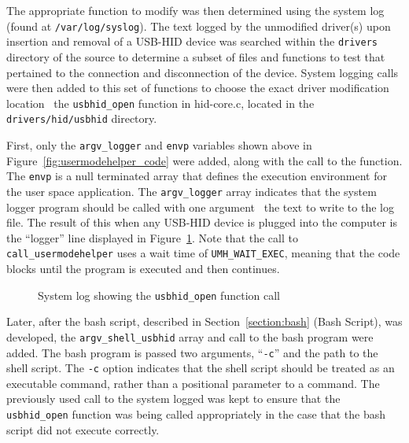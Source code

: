 \documentclass[pagenumbers]{ieee}
\begin{document}
The appropriate function to modify was then determined using the system log (found at \texttt{/var/log/syslog}). The text logged by the unmodified driver(s) upon insertion and removal of a USB-HID device was searched within the \texttt{drivers} directory of the source to determine a subset of files and functions to test that pertained to the connection and disconnection of the device. System logging calls were then added to this set of functions to choose the exact driver modification location \textemdash \ the \texttt{usbhid\_open} function in hid-core.c, located in the \texttt{drivers/hid/usbhid} directory.

First, only the \texttt{argv\_logger} and \texttt{envp} variables shown above in Figure~\ref{fig:usermodehelper_code} were added, along with the call to the function. The \texttt{envp} is a null terminated array that defines the execution environment for the user space application. The \texttt{argv\_logger} array indicates that the system logger program should be called with one argument \textemdash \ the text to write to the log file. The result of this when any USB-HID device is plugged into the computer is the ``logger'' line displayed in  Figure~\ref{fig:syslog}. Note that the call to \texttt{call\_usermodehelper} uses a wait time of \texttt{UMH\_WAIT\_EXEC}, meaning that the code blocks until the program is executed and then continues.

\begin{figure}[H]
   \caption{System log showing the \texttt{usbhid\_open} function call}
   \label{fig:syslog}
\end{figure}

Later, after the bash script, described in Section~\ref{section:bash} (Bash Script), was developed, the \texttt{argv\_shell\_usbhid} array and call to the bash program were added. The bash program is passed two arguments, ``\texttt{-c}'' and the path to the shell script. The \texttt{-c} option indicates that the shell script should be treated as an executable command, rather than a positional parameter to a command. The previously used call to the system logged was kept to ensure that the \texttt{usbhid\_open} function was being called appropriately in the case that the bash script did not execute correctly. 
\end{document}
